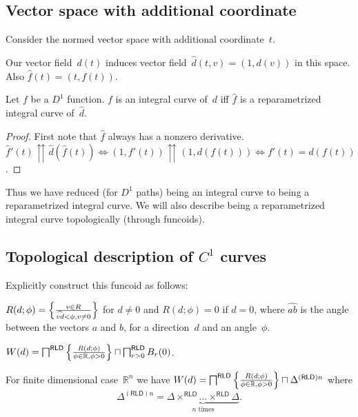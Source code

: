 \subsection{Vector space with additional coordinate}

Consider the normed vector space with additional coordinate~$t$.

Our vector field~$d(t)$ induces vector field~$\hat{d}(t,v)=(1,d(v))$ in this space. Also $\hat{f}(t)=(t,f(t))$.

\begin{prop}
Let $f$ be a $D^1$ function. $f$ is an integral curve of~$d$ iff $\hat{f}$ is a reparametrized integral curve of~$\hat{d}$.
\end{prop}

\begin{proof}
First note that $\hat{f}$ always has a nonzero derivative.
$\hat{f}'(t)\upuparrows \hat{d}(\hat{f}(t)) \Leftrightarrow (1,f'(t))\upuparrows (1,d(f(t))) \Leftrightarrow
f'(t)=d(f(t))$.
\end{proof}

Thus we have reduced (for $D^1$ paths) being an integral curve to being a reparametrized integral curve.
We will also describe being a reparametrized integral curve topologically (through funcoids).

\subsection{Topological description of $C^1$ curves}

Explicitly construct this funcoid as follows:

$R(d;\phi) = \left\{ \frac{v\in R}{\widehat{vd}<\phi, v\ne 0}\right\}$ for $d\ne 0$ and $R(d;\phi) = 0$ if $d=0$,
where $\widehat{ab}$ is the angle between the vectors $a$ and $b$,
for a direction~$d$ and an angle~$\phi$.

\begin{defn}
$W(d) = \bigsqcap^{\mathsf{RLD}}\left\{ \frac{R(d;\phi)}{\phi\in\mathbb{R},\phi>0}\right\} \sqcap \bigsqcap^{\mathsf{RLD}}_{r>0}B_r(0)$.
\end{defn}

\begin{prop}
For finite dimensional case~$\mathbb{R}^n$ we have
$W(d) = \bigsqcap^{\mathsf{RLD}}\left\{ \frac{R(d;\phi)}{\phi\in\mathbb{R},\phi>0}\right\} \sqcap \Delta^{(\mathsf{RLD})n}$
where \[ \Delta^{(\mathsf{RLD})n} = \underbrace{\Delta\times^{\mathsf{RLD}}\dots\times^{\mathsf{RLD}}\Delta}_{n\text{ times}}. \]
\end{prop}

